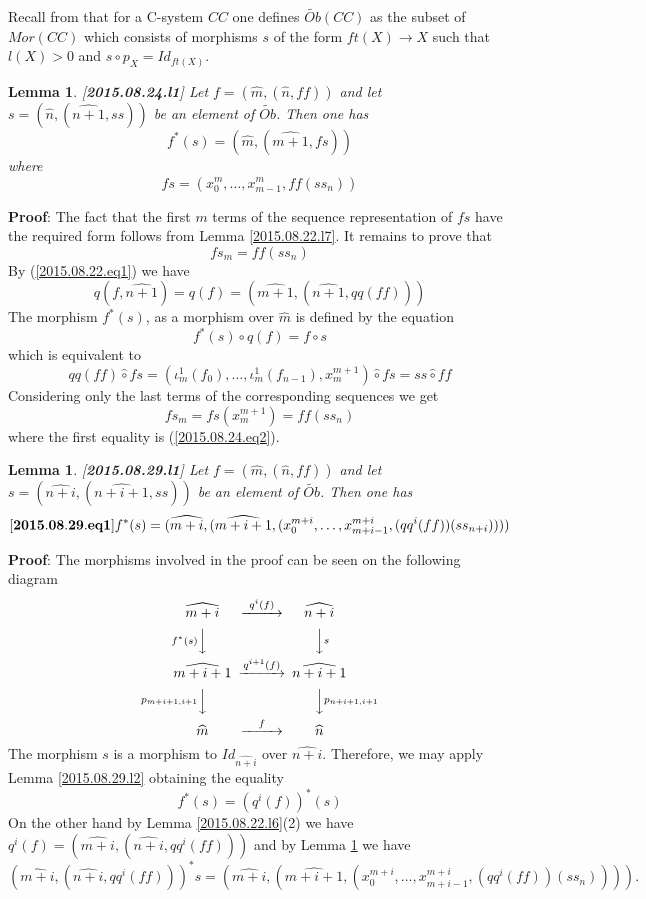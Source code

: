 \documentclass[11pt]{article}
\newenvironment{eq}{\begin{equation}}{\end{equation}}
\newenvironment{proof}{{\bf Proof}:}{\vskip 5mm }
\newtheorem{lemma}[proposition]{Lemma}
\newcommand{\llabel}[1]{\label{#1}[{\bf #1}]}
\newcommand{\sr}{\rightarrow}
\newcommand{\wt}{\widetilde}
\newcommand{\wh}{\widehat}
\newcommand{\hc}{\wh{\circ}}
\begin{document}
Recall from \cite{Csubsystems} that for a C-system $CC$ one defines $\wt{Ob}(CC)$ as the subset of $Mor(CC)$ which consists of morphisms $s$ of the form $ft(X)\sr X$ such that $l(X)>0$ and $s\circ p_X=Id_{ft(X)}$. 
%
\begin{lemma}
\llabel{2015.08.24.l1}
Let $f=(\wh{m},(\wh{n},ff))$ and let $s=(\wh{n},(\wh{n+1},ss))$ be an element of $\wt{Ob}$. Then one has
%
$$f^*(s)=(\wh{m},(\wh{m+1},fs))$$
%
where 
%
$$fs=(x_0^m,\dots,x_{m-1}^m,ff(ss_n))$$
%
\end{lemma}
%
\begin{proof}
The fact that the first $m$ terms of the sequence representation of $fs$ have the required form follows from Lemma \ref{2015.08.22.l7}. It remains to prove that
%
$$fs_m=ff(ss_n)$$
%
By (\ref{2015.08.22.eq1}) we have  
%
$$q(f,\wh{n+1})=q(f)=(\wh{m+1},(\wh{n+1},qq(ff)))$$
%
The morphism $f^*(s)$, as a morphism over $\wh{m}$ is defined by the equation
%
$$f^*(s)\circ q(f)=f\circ s$$
%
which is equivalent to
%
$$qq(ff)\hc fs=(\iota_m^1(f_0),\dots,\iota_m^1(f_{n-1}),x_m^{m+1})\hc fs=ss\hc ff$$
%
Considering only the last terms of the corresponding sequences we get
%
$$fs_{m}=fs(x_m^{m+1})=ff(ss_n)$$
%
where the first equality is (\ref{2015.08.24.eq2}). 
%
\end{proof}
%
\begin{lemma}
\llabel{2015.08.29.l1}
Let $f=(\wh{m},(\wh{n},ff))$ and let $s=(\wh{n+i},(\wh{n+i+1},ss))$ be an element of $\wt{Ob}$. Then one has
%
\begin{eq}\llabel{2015.08.29.eq1}
f^*(s)=(\wh{m+i},(\wh{m+i+1},(x_0^{m+i},\dots,x_{m+i-1}^{m+i},(qq^i(ff))(ss_{n+i}))))
\end{eq}
%
\end{lemma}
%
\begin{proof}
The morphisms involved in the proof can be seen on the following diagram
%
$$
\begin{CD}
\wh{m+i} @>q^i(f)>> \wh{n+i}\\
@Vf^*(s)VV @VVsV\\
\wh{m+i+1} @>q^{i+1}(f)>> \wh{n+i+1}\\
@Vp_{m+i+1,i+1}VV @VVp_{n+i+1,i+1}V\\
\wh{m} @>f>> \wh{n}
\end{CD}
$$
%
The morphism $s$ is a morphism to $Id_{\wh{n+i}}$ over $\wh{n+i}$. Therefore, we may apply Lemma \ref{2015.08.29.l2} obtaining the equality
%
$$f^*(s)=(q^i(f))^*(s)$$
%
On the other hand by Lemma \ref{2015.08.22.l6}(2) we have $q^i(f)=(\wh{m+i},(\wh{n+i},qq^i(ff)))$ and by Lemma \ref{2015.08.24.l1} we have
%
$$(\wh{m+i},(\wh{n+i},qq^i(ff)))^*s=(\wh{m+i},(\wh{m+i+1},(x_0^{m+i},\dots,x_{m+i-1}^{m+i},(qq^i(ff))(ss_n)))).$$
%
\end{proof}
\end{document}
